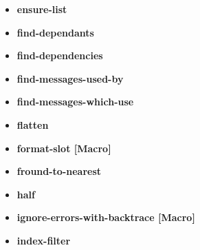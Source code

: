 \documentclass [11pt]{book}
\begin{document}
\begin{itemize}
\item {}
\label{prim:ensure-list}
\textbf{ensure-list}





\item {}
\label{prim:find-dependants}
\textbf{find-dependants}





\item {}
\label{prim:find-dependencies}
\textbf{find-dependencies}





\item {}
\label{prim:find-messages-used-by}
\textbf{find-messages-used-by}





\item {}
\label{prim:find-messages-which-use}
\textbf{find-messages-which-use}





\item {}
\label{prim:flatten}
\textbf{flatten}





\item {}
\label{prim:format-slot}
\textbf{format-slot [Macro]}





\item {}
\label{prim:fround-to-nearest}
\textbf{fround-to-nearest}





\item {}
\label{prim:half}
\textbf{half}





\item {}
\label{prim:ignore-errors-with-backtrace}
\textbf{ignore-errors-with-backtrace [Macro]}





\item {}
\label{prim:index-filter}
\textbf{index-filter}






\end{itemize}
\end{document}
